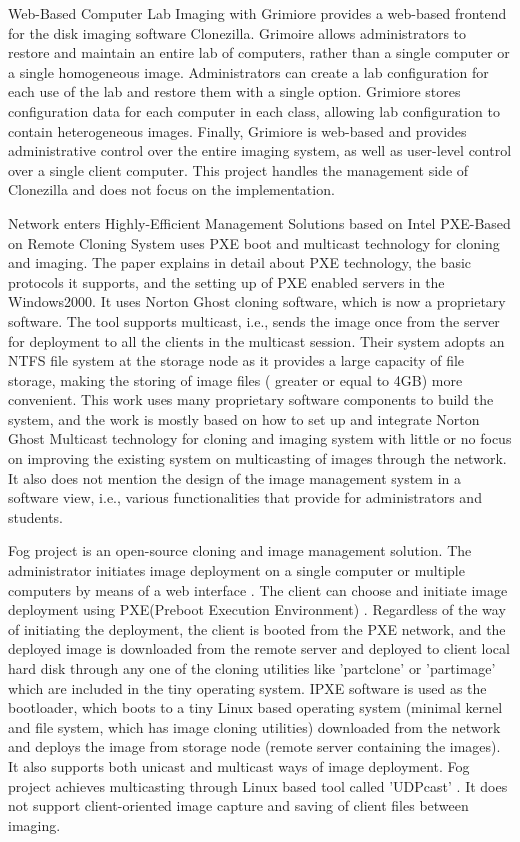 \documentclass[a4paper,12pt]{article}
\begin{document}
Web-Based Computer Lab Imaging with Grimiore \cite{Meek:2009:WBC:1629501.1629507} provides a web-based frontend for the disk imaging software Clonezilla. Grimoire allows administrators to restore and maintain an entire lab of computers, rather than a single computer or a single homogeneous image. Administrators can create a lab configuration for each use of the lab and restore them with a single option. Grimiore stores configuration data for each computer in each class, allowing lab configuration to contain heterogeneous images. Finally, Grimiore is web-based and provides administrative control over the entire imaging system, as well as user-level control over a single client computer.
This project handles the management side of Clonezilla and does not focus on the implementation.

Network enters Highly-Efficient Management Solutions based on Intel PXE-Based on Remote Cloning System \cite{LiJinhui} uses PXE boot and multicast technology for cloning and imaging. The paper explains in detail about PXE technology, the basic protocols it supports, and the setting up of PXE enabled servers in the Windows2000.
It uses Norton Ghost cloning software, which is now a proprietary software. The tool supports multicast, i.e., sends the image once from the server for deployment to all the clients in the multicast session. Their system adopts an NTFS file system at the storage node as it provides a large capacity of file storage, making the storing of image files ( greater or equal to 4GB) more convenient. This work uses many proprietary software components to build the system, and the work is mostly based on how to set up and integrate Norton Ghost Multicast technology for cloning and imaging system with little or no focus on improving the existing system on multicasting of images through the network. It also does not mention the design of the image management system in a software view, i.e., various functionalities that provide for administrators and students.


Fog project \cite{fogproject} is an open-source cloning and image management solution. The administrator initiates image deployment on a single computer or multiple computers by means of a web interface \cite{wiki}. The client can choose and initiate image deployment using PXE(Preboot Execution Environment) \cite{PXE}. Regardless of the way of initiating the deployment, the client is booted from the PXE network, and the deployed image is downloaded from the remote server and deployed to client local hard disk through any one of the cloning utilities like 'partclone' \cite{Partclone} or 'partimage' \cite{Partimage} which are included in the tiny operating system. IPXE \cite{IPXE} software is used as the bootloader, which boots to a tiny Linux based operating system (minimal kernel and file system, which has image cloning utilities) downloaded from the network and deploys the image from storage node (remote server containing the images). It also supports both unicast and multicast ways of image deployment. Fog project achieves multicasting through Linux based tool called 'UDPcast' \cite{udpcast}. It does not support client-oriented image capture and saving of client files between imaging.
\end{document}

